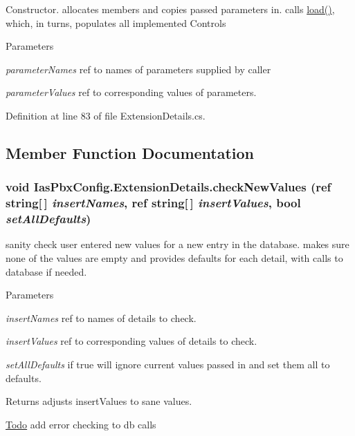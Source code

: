Constructor. allocates members and copies passed parameters in. calls \hyperlink{class_ias_pbx_config_1_1_extension_details_a9945d9c89ebedaed6d13fadc5bb5ad40}{load()}, which, in turns, populates all implemented Controls 
\begin{DoxyParams}{Parameters}
\item[{\em parameterNames}]ref to names of parameters supplied by caller \item[{\em parameterValues}]ref to corresponding values of parameters. \end{DoxyParams}


Definition at line 83 of file ExtensionDetails.cs.

\subsection{Member Function Documentation}
\hypertarget{class_ias_pbx_config_1_1_extension_details_ac7daf3d7399d8e980091c5f962f32b0c}{
\subsubsection[{checkNewValues}]{\setlength{\rightskip}{0pt plus 5cm}void IasPbxConfig.ExtensionDetails.checkNewValues (ref string\mbox{[}$\,$\mbox{]} {\em insertNames}, \/  ref string\mbox{[}$\,$\mbox{]} {\em insertValues}, \/  bool {\em setAllDefaults})}}
\label{class_ias_pbx_config_1_1_extension_details_ac7daf3d7399d8e980091c5f962f32b0c}


sanity check user entered new values for a new entry in the database. makes sure none of the values are empty and provides defaults for each detail, with calls to database if needed. 
\begin{DoxyParams}{Parameters}
\item[{\em insertNames}]ref to names of details to check. \item[{\em insertValues}]ref to corresponding values of details to check. \item[{\em setAllDefaults}]if true will ignore current values passed in and set them all to defaults. \end{DoxyParams}
\begin{DoxyReturn}{Returns}
adjusts insertValues to sane values. 
\end{DoxyReturn}
\begin{Desc}
\item[\hyperlink{todo__todo000030}{Todo}]add error checking to db calls \end{Desc}


